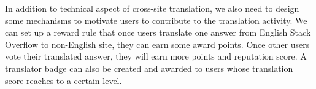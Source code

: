 In addition to technical aspect of cross-site translation, we also need to design some mechanisms to motivate users to contribute to the translation activity.
We can set up a reward rule that once users translate one answer from English Stack Overflow to non-English site, they can earn some award points.
Once other users vote their translated answer, they will earn more points and reputation score.
A translator badge can also be created and awarded to users whose translation score reaches to a certain level.

